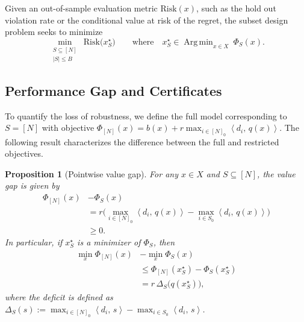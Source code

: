 \documentclass[accepted]{uai2026}
\theoremstyle{plain}
\newtheorem{proposition}[theorem]{Proposition}
\theoremstyle{definition}
\theoremstyle{remark}
\newcommand{\ip}[2]{\left\langle #1 ,\, #2 \right\rangle}
\DeclareMathOperator*{\Argmin}{Arg\,min}
\begin{document}
Given an out-of-sample evaluation metric $\mathrm{Risk}(x)$, such as the hold out violation rate or the conditional value at risk of the regret, the subset design problem seeks to minimize
\begin{equation}\label{eq:diseno}
\min_{\substack{S\subseteq[N]\\ |S|\le B}}\ \mathrm{Risk}\!\big(x_S^\star\big)\qquad
\text{where}\quad x_S^\star\in\Argmin_{x\in X}\ \Phi_S(x).
\end{equation}

\subsection{Performance Gap and Certificates}

To quantify the loss of robustness, we define the full model corresponding to $S=[N]$ with objective $\Phi_{[N]}(x)=b(x)+r\max_{i\in [N]_0}\ip{d_i}{q(x)}$. The following result characterizes the difference between the full and restricted objectives.


\begin{proposition}[Pointwise value gap]\label{prop:gap-ptwise}
For any $x\in X$ and $S\subseteq[N]$, the value gap is given by
\begin{equation}\label{eq:gap-ptwise}
\begin{split}
\Phi_{[N]}(x) &- \Phi_S(x) \\
&= r\Big(\max_{i\in [N]_0}\ip{d_i}{q(x)}-\max_{i\in S_0}\ip{d_i}{q(x)}\Big) \\
&\ge 0.
\end{split}
\end{equation}
In particular, if $x_S^\star$ is a minimizer of $\Phi_S$, then
\begin{equation}\label{eq:gap-optvals}
\begin{split}
\min_{x}\Phi_{[N]}(x) &- \min_{x}\Phi_S(x) \\
&\le \Phi_{[N]}(x_S^\star)-\Phi_S(x_S^\star) \\
&= r\,\Delta_S\big(q(x_S^\star)\big),
\end{split}
\end{equation}
where the deficit is defined as $\Delta_S(s):=\max_{i\in [N]_0}\ip{d_i}{s}-\max_{i\in S_0}\ip{d_i}{s}$.
\end{proposition}
\end{document}
